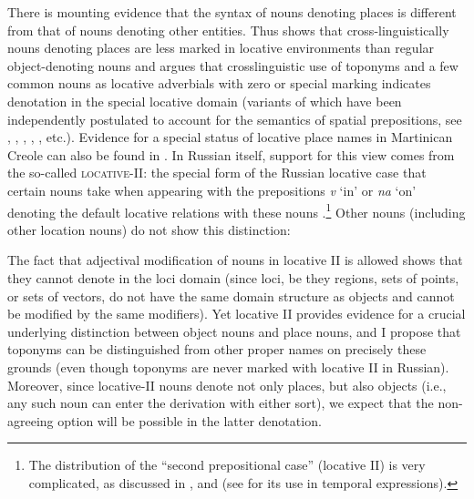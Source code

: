 \documentclass[output=paper,colorlinks,citecolor=brown]{langscibook}
\begin{document}
There is mounting evidence that the syntax of nouns denoting places is different from that of nouns denoting other entities. Thus \citet{Haspelmath2019} shows that cross-linguistically nouns denoting places are less marked in locative environments than regular object-denoting nouns and \citet{Matushansky2019} argues that crosslinguistic use of toponyms and a few common nouns as locative adverbials with zero or special marking indicates denotation in the special locative domain (variants of which have been independently postulated to account for the semantics of spatial prepositions, see \citealt{Bierwisch1988}, \citealt{Wunderlich1991}, \citealt{ZwartsWinter2000}, \citealt{Kracht2002}, \citealt{Bateman2010}, etc.). Evidence for a special status of locative place names in Martinican Creole can also be found in \citealt{ZribiHertzLoic2014, ZribiHertzLoic2017, ZribiHertzLoic2018}. In Russian itself, support for this view comes from the so-called \textsc{locative-II}: the special form of the Russian locative case that certain nouns take when appearing with the prepositions \textit{v} ‘in’ or \textit{na} ‘on’ denoting the default locative relations with these nouns .\footnote{The distribution of the “second prepositional case” (locative II) is very complicated, as discussed in \citet{Plungjan2002}, \citet{Brown2007} and \citet{Itkin2016} (see \citealt{Nesset2004} for its use in temporal expressions).} Other nouns (including other location nouns) do not show this distinction:

\ea\label{mat:ex:vodaVtazu-nadpisNataze}
\z
\z

\noindent The fact that adjectival modification of nouns in locative II is allowed shows that they cannot denote in the loci domain (since loci, be they regions, sets of points, or sets of vectors, do not have the same domain structure as objects and cannot be modified by the same modifiers). Yet locative II provides evidence for a crucial underlying distinction between object nouns and place nouns, and I propose that toponyms can be distinguished from other proper names on precisely these grounds (even though toponyms are never marked with locative II in Russian). Moreover, since locative-II nouns denote not only places, but also objects (i.e., any such noun can enter the derivation with either sort), we expect that the non-agreeing option will be possible in the latter denotation.
\end{document}

